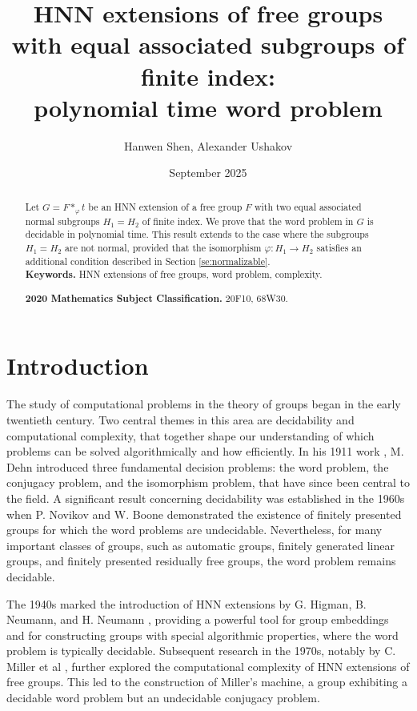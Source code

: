 \documentclass[12pt,oneside]{amsart}
\title{HNN extensions of free groups with equal associated subgroups of finite index:\\ polynomial time word problem}
\author{Hanwen Shen, Alexander Ushakov}
\date{September 2025}
\theoremstyle{definition}
\theoremstyle{case}
\begin{document}
\maketitle


\begin{abstract}
Let $G=F\ast_\varphi t$ be an HNN extension of a free group $F$
with two equal associated normal subgroups $H_1 = H_2$ of finite index.
We prove that the word problem in $G$ is decidable in polynomial time.
This result extends to the case where the subgroups $H_1=H_2$
are not normal, provided that the isomorphism $\varphi:H_1\to H_2$
satisfies an additional condition described in Section \ref{se:normalizable}.
\\
\noindent
\textbf{Keywords.}
HNN extensions of free groups, word problem, complexity.

\noindent
\textbf{2020 Mathematics Subject Classification.} 
20F10, 68W30.
\end{abstract}



\section{Introduction}
\label{se:Introduction}


The study of computational problems in the theory of groups began
in the early twentieth century.
Two central themes in this area are decidability and computational complexity, 
that together shape our understanding of which problems can be solved 
algorithmically and how efficiently.
In his 1911 work \cite{Dehn:1911}, M. Dehn introduced 
three fundamental decision problems: 
the word problem, the conjugacy problem, and the isomorphism problem, 
that have since been central to the field. A significant result 
concerning decidability was established in the 1960s when P. Novikov \cite{Novikov:1955} and W. Boone \cite{booneWordProblem1959} demonstrated 
the existence of finitely presented groups for which the word problems 
are undecidable.
Nevertheless, for many important classes of 
groups, such as automatic groups, finitely generated linear groups, 
and finitely presented residually free groups, the word problem remains decidable.

The 1940s marked the introduction of HNN extensions by G. Higman, B. Neumann, 
and H. Neumann \cite{higmanEmbeddingTheoremsGroups1949}, providing a powerful 
tool for group embeddings and for constructing groups with special
algorithmic properties, where the word problem is typically decidable. 
Subsequent research in the 1970s, notably by C. Miller et al
\cite{Miller1}, further explored the computational complexity of  
HNN extensions of free groups. This led to the construction of Miller's machine, 
a group exhibiting a decidable word problem but an undecidable conjugacy problem.
\end{document}
